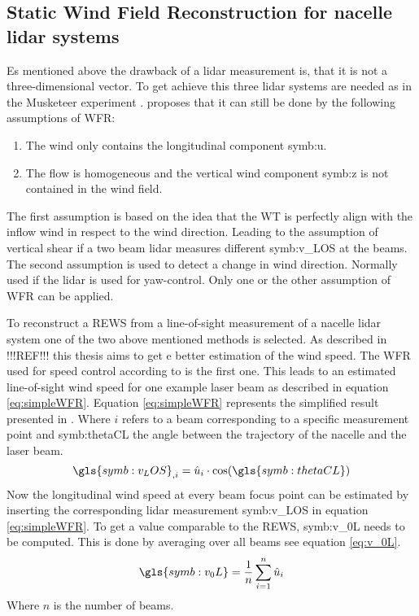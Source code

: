 \subsection{Static Wind Field Reconstruction for nacelle lidar systems}\label{subsec:StaticWFR}
Es mentioned above the drawback of a \gls{lidar} measurement is, that it is not a three-dimensional vector. To get achieve this three \gls{lidar} systems are needed as in the Musketeer experiment \cite{Mikkelsen2008}. \cite{Schlipf2011} proposes that it can still be done by the following assumptions of \gls{WFR}:
\begin{enumerate}
	\item The wind only contains the longitudinal component \gls{symb:u}.
	\item The flow is homogeneous and the vertical wind component \gls{symb:z} is not contained in the wind field. 
\end{enumerate}
The first assumption is based on the idea that the \gls{WT} is perfectly align with the inflow wind in respect to the wind direction. Leading to the assumption of vertical shear if a two beam \gls{lidar} measures different \gls{symb:v_LOS} at the beams. The second assumption is used to detect a change in wind direction. Normally used if the \gls{lidar} is used for yaw-control. Only one or the other assumption of \gls{WFR} can be applied.

\noindent To reconstruct a \gls{REWS} from a line-of-sight measurement of a nacelle \gls{lidar} system one of the two above mentioned methods is selected. As described in !!!REF!!! this thesis aims to get e better estimation of the wind speed. The \gls{WFR} used for speed control according to \cite{Schlipf2011} is the first one. This leads to an estimated line-of-sight wind speed for one example laser beam as described in equation \ref{eq:simpleWFR}. Equation \ref{eq:simpleWFR} represents the simplified result presented in \cite{Schlipf2015}. Where $i$ refers to a beam corresponding to a specific measurement point and \gls{symb:thetaCL} the angle between the trajectory of the nacelle and the laser beam. 
\begin{equation}
	\gls{symb:v_LOS}_{,i} =  \hat{u}_i \cdot \cos(\gls{symb:thetaCL})
	\label{eq:simpleWFR}	
\end{equation}
Now the longitudinal wind speed at every beam focus point can be estimated by inserting the corresponding \gls{lidar} measurement \gls{symb:v_LOS} in equation \ref{eq:simpleWFR}. To get a value comparable to the \gls{REWS}, \gls{symb:v_0L} needs to be computed. This is done by averaging over all beams see equation \ref{eq:v_0L}. 
\begin{equation}
	\gls{symb:v_0L} =  \frac{1}{n} \sum_{i=1}^{n} \hat{u}_i
	\label{eq:v_0L}	
\end{equation}  
Where $n$ is the number of beams. 


